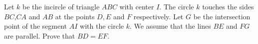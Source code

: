 Let $k$ be the incircle of triangle $ABC$ with center $I$.
The circle $k$ touches the sides $BC$,$CA$ and $AB$ at the points $D,E$ and $F$ respectively.
Let $G$ be the intersection point of the segment $AI$ with the circle $k$.
We assume that the lines $BE$ and $FG$ are parallel. Prove that $BD=EF$.
